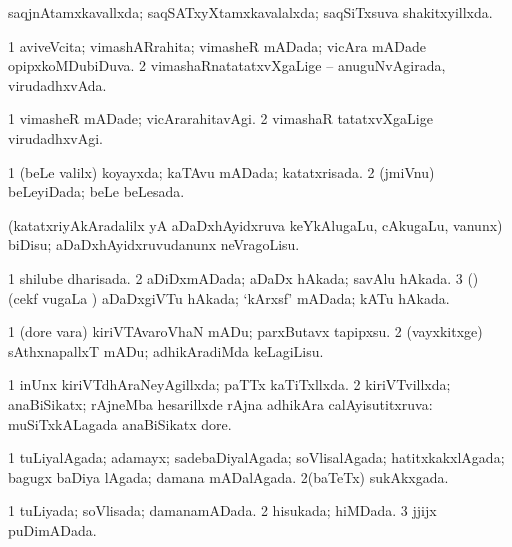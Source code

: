 {\bentry
{} 
\gl{\gu}
\expl{}
\bmng
 saqjnAtamxkavallxda; saqSATxyXtamxkavalalxda; saqSiTxsuva shakitxyillxda. 
\emng
\eentry

\bentry
{} 
\gl{\gu}
\expl{}
\bmng
\bnum
\num{1} aviveVcita; vimashARrahita; vimasheR mADada; vicAra mADade opipxkoMDubiDuva. 
\num{2} vimashaRnatatatxvXgaLige -- anuguNvAgirada, virudadhxvAda. 
\enum
\emng
\eentry

\bentry
{} 
\gl{\kirxvi}
\expl{}
\bmng
\bnum
\num{1} vimasheR mADade; vicArarahitavAgi. 
\num{2} vimashaR tatatxvXgaLige virudadhxvAgi. 
\enum
\emng
\eentry

\bentry
{} 
\gl{\gu}
\expl{}
\bmng
\bnum
\num{1} (beLe \mo valilx) koyayxda; kaTAvu mADada; katatxrisada. 
\num{2} (jmiVnu) beLeyiDada; beLe beLesada. 
\enum
\emng
\eentry

\bentry
{} 
\gl{\akirx}
\expl{}
\bmng
 (katatxriyAkAradalilx yA aDaDxhAyidxruva keYkAlugaLu, cAkugaLu, \mo vanunx) biDisu; aDaDxhAyidxruvudanunx neVragoLisu. 
\emng
\eentry

\bentry
{} 
\gl{\gu}
\expl{}
\bmng
\bnum
\num{1} shilube dharisada. 
\num{2} aDiDxmADada; aDaDx hAkada; savAlu hAkada. 
\num{3} (\birx) (cekf \mo vugaLa \vi) aDaDxgiVTu hAkada; `kArxsf' mADada; kATu hAkada. 
\enum
\emng
\eentry

\bentry
{} 
\gl{\sakirx}
\expl{}
\bmng
\bnum
\num{1} (dore \mo vara) kiriVTAvaroVhaN mADu; parxButavx tapipxsu. 
\num{2} (vayxkitxge) sAthxnapallxT mADu; adhikAradiMda keLagiLisu. 
\enum
\emng
\eentry

\bentry
{} 
\gl{\gu}
\expl{}
\bmng
\bnum
\num{1} inUnx kiriVTdhAraNeyAgillxda; paTTx kaTiTxllxda. 
\num{2} kiriVTvillxda; anaBiSikatx; rAjneMba hesarillxde rAjna adhikAra calAyisutitxruva:  muSiTxkALagada anaBiSikatx dore. 
\enum
\emng
\eentry

\bentry
{} 
\gl{\gu}
\expl{}
\bmng
\bnum
\num{1} tuLiyalAgada; adamayx; sadebaDiyalAgada; soVlisalAgada; hatitxkakxlAgada; bagugx baDiya lAgada; damana mADalAgada. 
\num{2}(baTeTx) sukAkxgada. 
\enum
\emng
\eentry

\bentry
{} 
\gl{\gu}
\expl{}
\bmng
\bnum
\num{1} tuLiyada; soVlisada; damanamADada. 
\num{2} hisukada; hiMDada. 
\num{3} jjijx puDimADada. 
\enum
\emng
\eentry

}
